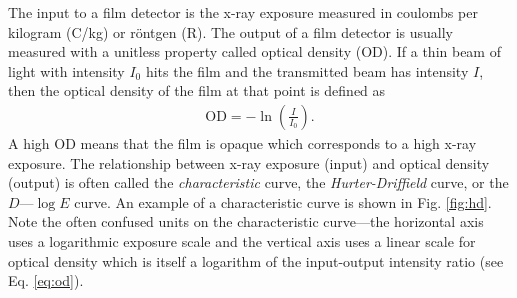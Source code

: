 \documentclass[mphy386-notes.tex]{subfiles}
\begin{document}


The input to a film detector is the x-ray exposure measured in coulombs per
kilogram (C/kg) or r\"{o}ntgen (R). The output of a film detector is usually
measured with a unitless property called optical density (OD). If a thin beam of
light with intensity $I_0$ hits the film and the transmitted beam has intensity
$I$, then the optical density of the film at that point is defined as
\begin{align}
  \text{OD} = -\ln\left(\frac{I}{I_0}\right).\label{eq:od}
\end{align}
A high OD means that the film is opaque which corresponds to a high x-ray
exposure. The relationship between x-ray exposure (input) and optical density
(output) is often called the \textit{characteristic} curve, the
\textit{Hurter-Driffield} curve, or the $D$---$\log E$ curve. An example of a
characteristic curve is shown in Fig. \ref{fig:hd}. Note the often confused
units on the characteristic curve---the horizontal axis uses a logarithmic
exposure scale and the vertical axis uses a linear scale for optical density
which is itself a logarithm of the input-output intensity ratio (see Eq.
\ref{eq:od}).

\end{document}
